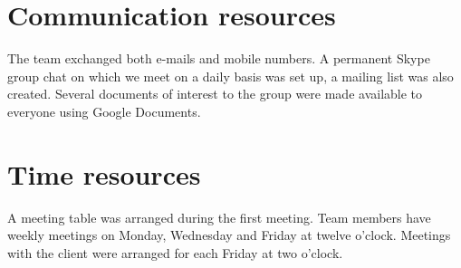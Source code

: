 
\section{Communication resources}

The team exchanged both e-mails and mobile numbers. A permanent Skype
group chat on which we meet on a daily basis was set up, a mailing
list was also created. Several documents of interest to the group
were made available to everyone using Google Documents.


\section{Time resources}

A meeting table was arranged during the first meeting. Team members
have weekly meetings on Monday, Wednesday and Friday at twelve o'clock.
Meetings with the client were arranged for each Friday at two o'clock.
